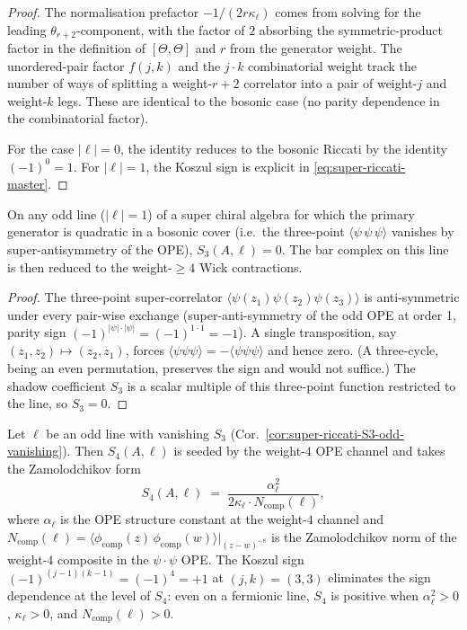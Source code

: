 \begin{proof}[Proof]
The normalisation prefactor $-1/(2 r \kappa_\ell)$ comes from solving
for the leading $\theta_{r+2}$-component, with the factor of $2$
absorbing the symmetric-product factor in the definition of
$[\Theta, \Theta]$ and $r$ from the generator weight. The
unordered-pair factor $f(j,k)$ and the $j \cdot k$ combinatorial
weight track the number of ways of splitting a weight-$r+2$
correlator into a pair of weight-$j$ and weight-$k$ legs. These are
identical to the bosonic case (no parity dependence in the
combinatorial factor).

For the case $|\ell| = 0$, the identity reduces to the bosonic
Riccati by the identity $(-1)^0 = 1$. For $|\ell| = 1$, the Koszul
sign is explicit in \eqref{eq:super-riccati-master}.
\end{proof}

\begin{corollary}[Super-Riccati odd-line \texorpdfstring{$S_3 = 0$}{S-3 = 0} vanishing]
\label{cor:super-riccati-S3-odd-vanishing}
On any odd line ($|\ell| = 1$) of a super chiral algebra for which the
primary generator is quadratic in a bosonic cover (i.e.\ the three-point
$\langle \psi \, \psi \, \psi \rangle$ vanishes by super-antisymmetry
of the OPE), $S_3(A, \ell) = 0$. The bar complex on this line is then
reduced to the weight-$\ge 4$ Wick contractions.
\end{corollary}

\begin{proof}[Proof]
The three-point super-correlator
$\langle \psi(z_1) \psi(z_2) \psi(z_3) \rangle$ is anti-symmetric
under every pair-wise exchange (super-anti-symmetry of the odd OPE
at order 1, parity sign $(-1)^{|\psi|\cdot|\psi|} = (-1)^{1\cdot 1}
= -1$). A single transposition, say $(z_1, z_2) \mapsto (z_2, z_1)$,
forces $\langle \psi \psi \psi \rangle = -\langle \psi \psi \psi
\rangle$ and hence zero. (A three-cycle, being an even permutation,
preserves the sign and would not suffice.) The shadow coefficient
$S_3$ is a scalar multiple of this three-point function restricted
to the line, so $S_3 = 0$.
\end{proof}

\begin{corollary}
\label{cor:super-riccati-S4-odd-bosonic-like}
Let $\ell$ be an odd line with vanishing $S_3$ (Cor.~\ref{cor:super-riccati-S3-odd-vanishing}).
Then $S_4(A, \ell)$ is seeded by the weight-$4$ OPE channel and takes
the Zamolodchikov form
\[
S_4(A, \ell)
\;=\; \frac{\alpha_\ell^2}{2 \kappa_\ell \cdot N_{\mathrm{comp}}(\ell)},
\]
where $\alpha_\ell$ is the OPE structure constant at the weight-$4$
channel and $N_{\mathrm{comp}}(\ell) = \langle \phi_{\mathrm{comp}}(z) \,
\phi_{\mathrm{comp}}(w) \rangle|_{(z-w)^{-8}}$ is the Zamolodchikov
norm of the weight-$4$ composite in the $\psi \cdot \psi$ OPE. The
Koszul sign $(-1)^{(j-1)(k-1)} = (-1)^{4} = +1$ at $(j, k) = (3, 3)$
eliminates the sign dependence at the level of $S_4$: even on a
fermionic line, $S_4$ is positive when $\alpha_\ell^2 > 0$,
$\kappa_\ell > 0$, and $N_{\mathrm{comp}}(\ell) > 0$.
\end{corollary}

